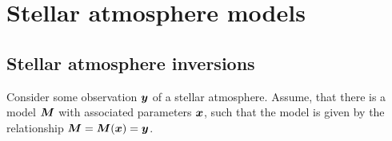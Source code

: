 \documentclass[a4paper,11pt]{report}
\begin{document}

\section{Stellar atmosphere models}
\subsection{Stellar atmosphere inversions}
Consider some observation $\bm{y}$ of a stellar atmosphere. Assume, that there is a model $\bm{M}$ with associated parameters $\bm{x}$, such that the model is given by the relationship $\bm{M} = \bm{M}(\bm{x}) = \bm{y}$.
\end{document}
